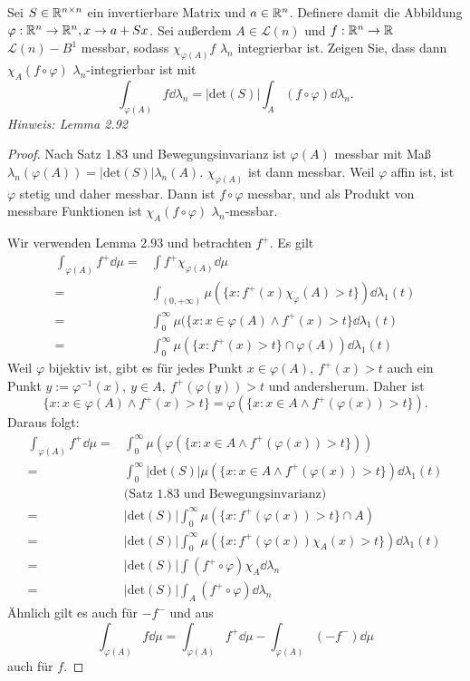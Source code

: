 \begin{Problem}
	Sei $S\in \mathbb{R}^{n\times n}$ ein invertierbare Matrix und $a\in \mathbb{R}^n$. Definere damit die Abbildung $\varphi:\mathbb{R}^n\to \mathbb{R}^n, x\to a+Sx$. Sei außerdem $A\in \mathcal{L}(n)$ und $f:\mathbb{R}^n\to \mathbb{R}$ $\mathcal{L}(n)-B^1$ messbar, sodass $\chi_{\varphi(A)}f$ $\lambda_n$ integrierbar ist. Zeigen Sie, dass dann $\chi_A(f\circ \varphi)$ $\lambda_n$-integrierbar ist mit
	\[
		\int_{\varphi(A)}f\dd{\lambda_n}=|\text{det}(S)|\int_A (f\circ\varphi) \dd{\lambda_n}
	.\] 
	{\footnotesize \emph{Hinweis: Lemma 2.92}}
\end{Problem}
\begin{proof}
	Nach Satz 1.83 und Bewegungsinvarianz ist $\varphi(A)$ messbar mit Maß $\lambda_n(\varphi(A))=|\text{det}(S)|\lambda_n(A)$. $\chi_{\varphi(A)}$ ist dann messbar. Weil $\varphi$ affin ist, ist $\varphi$ stetig und daher messbar. Dann ist $f\circ\varphi$ messbar, und als Produkt von messbare Funktionen ist $\chi_A(f\circ \varphi)$ $\lambda_n$-messbar.

	Wir verwenden Lemma 2.93 und betrachten $f^+$. Es gilt
	\begin{align*}
		\int_{\varphi(A)}f^+\dd{\mu}=&\int f^+\chi_{\varphi(A)}\dd{\mu}\\
		=&\int_{(0,+\infty)}\mu(\{x:f^+(x)\chi_{\varphi}(A)>t\})\dd{\lambda_1(t)}\\
		=&\int_0^\infty \mu(\{x:x\in \varphi(A)\wedge f^+(x)>t\} \dd{\lambda_1(t)}\\
		=&\int_0^\infty\mu(\{x:f^+(x)>t\} \cap \varphi(A))\dd{\lambda_1(t)}
	\end{align*}
	Weil $\varphi$ bijektiv ist, gibt es f\"{u}r jedes Punkt  $x\in\varphi(A),~f^+(x)>t$ auch ein Punkt $y:=\varphi^{-1}(x),~y\in A,~f^+(\varphi(y))>t$ und andersherum. Daher ist 
	\[
	\{x:x\in \varphi(A)\wedge f^+(x)>t\} =\varphi(\{x:x\in A\wedge f^+(\varphi(x))>t\})
	.\] 
	Daraus folgt:
	\begin{align*}
		\int_{\varphi(A)}f^+\dd{\mu}=&\int_0^\infty \mu(\varphi(\{x:x\in A\wedge f^+(\varphi(x))>t\} ))\\
		=&\int_0^\infty|\text{det}(S)|\mu(\{x:x\in A\wedge f^+(\varphi(x))>t\})\dd{\lambda_1(t)}  \\
		&\text{(Satz 1.83 und Bewegungsinvarianz)}\\
		=&|\text{det}(S)|\int_0^\infty \mu(\{x:f^+(\varphi(x))>t\}\cap A)\\
		=&|\text{det}(S)|\int_0^\infty \mu(\{x:f^+(\varphi(x))\chi_A(x)>t\} )\dd{\lambda_1(t)}\\
		=&|\text{det}(S)|\int (f^+\circ\varphi)\chi_A\dd{\lambda_n}\\
		=&|\text{det}(S)|\int_A (f^+\circ\varphi)\dd{\lambda_n}
	\end{align*}
	Ähnlich gilt es auch für $-f^-$ und aus
	\[
	\int_{\varphi(A)}f\dd{\mu}=\int_{\varphi(A)} f^+\dd{\mu}-\int_{\varphi(A)}(-f^-)\dd{\mu}
	\]
	auch für $f$.
\end{proof}

